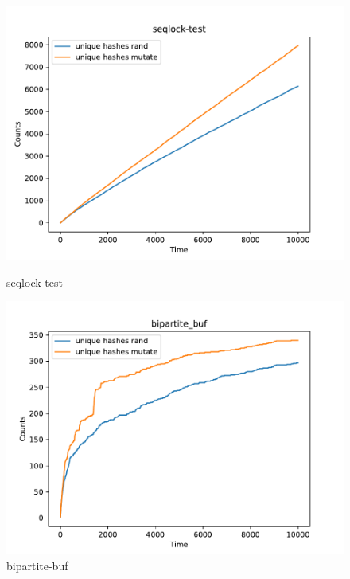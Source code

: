 \begin{figure}[H]
        \vspace{0.5cm}
       
        \begin{minipage}{0.45\textwidth}
            \centering
            \includegraphics[width=\textwidth]{figure/seqlock-test.pdf}
            \caption{seqlock-test}
            \label{cover-plot1-seqlock-test}
        \end{minipage}
        \hfill
        \begin{minipage}{0.45\textwidth}
            \centering
            \includegraphics[width=\textwidth]{figure/bipartite_buf.pdf}
            \caption{bipartite-buf}
            \label{cover-plot1-bipartite-buf}
        \end{minipage}


\end{figure}
